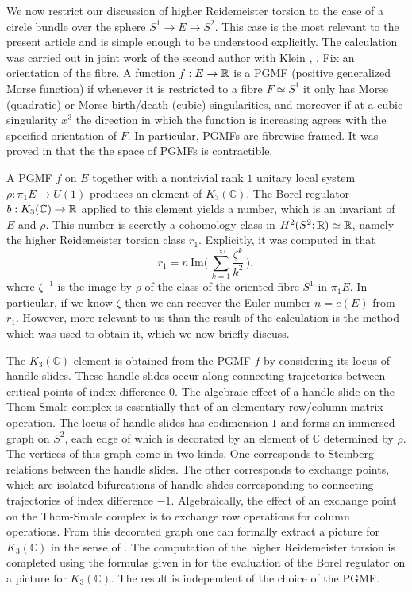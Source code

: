 \documentclass[11pt]{article}
\numberwithin{equation}{section}\providecommand{\dpl}{\displaystyle}
\theoremstyle{plain}
\theoremstyle{definition}
\newcommand{\bC}{\mathbb{C}}\newcommand{\bD}{\mathbb{D}}
\begin{document}
We now restrict our discussion of higher Reidemeister torsion to the case of a circle bundle over the sphere $S^1 \to E \to S^2$. This case is the most relevant to the present article and is simple enough to be understood explicitly. The calculation was carried out in joint work of the second author with Klein \cite{IK93a}, \cite{IK93}. Fix an orientation of the fibre. A function $f:E \to \mathbb{R}$ is a PGMF (positive generalized Morse function) if whenever it is restricted to a fibre $F \simeq S^1$ it only has Morse (quadratic) or Morse birth/death (cubic) singularities, and moreover if at a cubic singularity $x^3$ the direction in which the function is increasing agrees with the specified orientation of $F$. In particular, PGMFs are fibrewise framed. It was proved in \cite{IK93} that the the space of PGMFs is contractible.

A PGMF $f$ on $E$ together with a nontrivial rank $1$ unitary local system \hbox{$\rho : \pi_1E \to U(1)$} produces an element of $K_3(\bC)$. The Borel regulator $b:K_3(\bC) \to \bR$ applied to this element yields a number, which is an invariant of $E$ and $\rho$. This number is secretly a cohomology class in $H^2(S^2; \mathbb{R}) \simeq \mathbb{R}$, namely the higher Reidemeister torsion class $r_1$. Explicitly, it was computed in \cite{IK93} that\enlargethispage{.5\baselineskip}%
\[ r_1 =n \, \text{Im}\Big( \, \sum_{k=1}^\infty \frac{\zeta^k}{k^2} \, \Big), \]
where $\zeta^{-1}$ is the image by $\rho$ of the class of the oriented fibre $S^1$ in $\pi_1E$. In particular, if we know $\zeta$ then we can recover the Euler number $n=e(E)$ from $r_1$. However, more relevant to us than the result of the calculation is the method which was used to obtain it, which we now briefly discuss.

The $K_3(\bC)$ element is obtained from the PGMF $f$ by considering its locus of handle slides. These handle slides occur along connecting trajectories between critical points of index difference $0$. The algebraic effect of a handle slide on the Thom-Smale complex is essentially that of an elementary row/column matrix operation. The locus of handle slides has codimension $1$ and forms an immersed graph on $S^2$, each edge of which is decorated by an element of $\bC$ determined by $\rho$. The vertices of this graph come in two kinds. One corresponds to Steinberg relations between the handle slides. The other corresponds to exchange points, which are isolated bifurcations of handle-slides corresponding to connecting trajectories of index difference $-1.$ Algebraically, the effect of an exchange point on the Thom-Smale complex is to exchange row operations for column operations. From this decorated graph one can formally extract a picture for $K_3(\bC)$ in the sense of \cite{K}. The computation of the higher Reidemeister torsion is completed using the formulas given in \cite{IK93} for the evaluation of the Borel regulator on a picture for $K_3(\bC)$. The result is independent of the choice of the PGMF.
\end{document}
